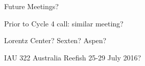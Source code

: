 Future Meetings?

Prior to Cycle 4 call: similar meeting?

Lorentz Center?  Sexten?  Aspen?

IAU 322 Australia Reefish 25-29 July 2016?

